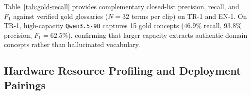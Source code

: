 \documentclass[conference]{IEEEtran}
\begin{document}
Table~\ref{tab:gold-recall} provides complementary closed-list precision, recall, and $F_1$ against verified gold glossaries ($N=32$ terms per clip) on TR-1 and EN-1. On TR-1, high-capacity \texttt{Qwen3.5-9B} captures 15 gold concepts ($46.9\%$ recall, $93.8\%$ precision, $F_1 = 62.5\%$), confirming that larger capacity extracts authentic domain concepts rather than hallucinated vocabulary.






\subsection{Hardware Resource Profiling and Deployment Pairings}
\label{sec:deployment}
\end{document}
